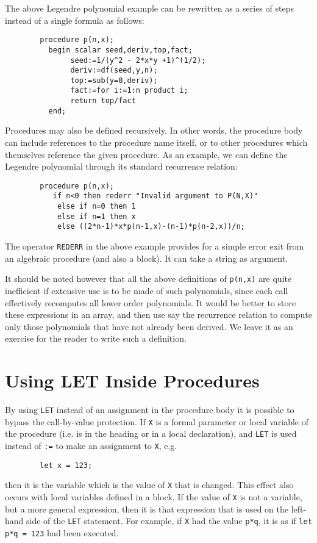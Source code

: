 The above Legendre polynomial example can be rewritten as a series of steps
instead of a single formula as follows:
\begin{verbatim}
        procedure p(n,x);
          begin scalar seed,deriv,top,fact;
               seed:=1/(y^2 - 2*x*y +1)^(1/2);
               deriv:=df(seed,y,n);
               top:=sub(y=0,deriv);
               fact:=for i:=1:n product i;
               return top/fact
          end;
\end{verbatim}
Procedures may also be defined recursively.  In other words, the procedure
body  can include references to the procedure name
itself, or to other procedures which themselves reference the given
procedure.  As an example, we can define the Legendre polynomial through
its standard recurrence relation:
\begin{verbatim}
        procedure p(n,x);
           if n<0 then rederr "Invalid argument to P(N,X)"
            else if n=0 then 1
            else if n=1 then x
            else ((2*n-1)*x*p(n-1,x)-(n-1)*p(n-2,x))/n;
\end{verbatim}

The operator {\tt REDERR}  in the above example provides
for a simple error exit from an algebraic procedure (and also a block).
It can take a string as argument.

It should be noted however that all the above definitions of {\tt p(n,x)} are
quite inefficient if extensive use is to be made of such polynomials, since
each call effectively recomputes all lower order polynomials. It would be
better to store these expressions in an array, and then use say the
recurrence relation to compute only those polynomials that have not already
been derived. We leave it as an exercise for the reader to write such a
definition.


\section{Using LET Inside Procedures}

By using {\tt LET}  instead of an assignment in the procedure
body  it is possible to bypass the call-by-value
 protection.  If {\tt X} is a formal parameter or local
variable of the procedure (i.e. is in the heading or in a local
declaration), and {\tt LET} is used instead of {\tt :=} to make an
assignment to {\tt X}, e.g.

\begin{verbatim}
        let x = 123;
\end{verbatim}
then it is the variable which is the value of {\tt X} that is changed.
This effect also occurs with local variables defined in a block.  If the
value of {\tt X} is not a variable, but a more general expression, then it
is that expression that is used on the left-hand side of the {\tt LET}
statement.  For example, if {\tt X} had the value {\tt p*q}, it is as if
{\tt let p*q = 123} had been executed.

